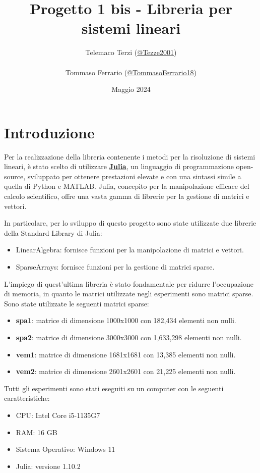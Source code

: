 \documentclass{article}
\title{Progetto 1 bis - Libreria per sistemi lineari}
\author{
    Telemaco Terzi (\href{https://github.com/Tezze2001}{@Tezze2001}) \\\\
    Tommaso Ferrario (\href{https://github.com/TommasoFerrario18}{@TommasoFerrario18})
    }
\date{Maggio 2024}
\begin{document}
\maketitle
\newtheorem{teorema}{Teorema}
\newtheorem{definizione}{Definizione}
\newtheorem{esempio}{Esempio}

\tableofcontents
\section{Introduzione}
Per la realizzazione della libreria contenente i metodi per la risoluzione di
sistemi lineari, è stato scelto di utilizzare \href{https://julialang.org/}{\textbf{Julia}},
un linguaggio di programmazione open-source, sviluppato per ottenere prestazioni
elevate e con una sintassi simile a quella di Python e MATLAB. Julia, concepito
per la manipolazione efficace del calcolo scientifico, offre una vasta gamma di
librerie per la gestione di matrici e vettori.

In particolare, per lo sviluppo di questo progetto sono state utilizzate due
librerie della Standard Library di Julia:
\begin{itemize}
    \item LinearAlgebra: fornisce funzioni per la manipolazione di matrici e vettori.
    \item SparseArrays: fornisce funzioni per la gestione di matrici sparse.
\end{itemize}

L'impiego di quest'ultima libreria è stato fondamentale per ridurre l'occupazione
di memoria, in quanto le matrici utilizzate negli esperimenti sono matrici sparse.
Sono state utilizzate le seguenti matrici sparse:
\begin{itemize}
    \item \textbf{spa1}: matrice di dimensione 1000x1000 con 182,434 elementi non nulli.
    \item \textbf{spa2}: matrice di dimensione 3000x3000 con 1,633,298 elementi non nulli.
    \item \textbf{vem1}: matrice di dimensione 1681x1681 con 13,385 elementi non nulli.
    \item \textbf{vem2}: matrice di dimensione 2601x2601 con 21,225 elementi non nulli.
\end{itemize}

Tutti gli esperimenti sono stati eseguiti su un computer con le seguenti caratteristiche:
\begin{itemize}
    \item CPU: Intel Core i5-1135G7
    \item RAM: 16 GB
    \item Sistema Operativo: Windows 11
    \item Julia: versione 1.10.2
\end{itemize}
\end{document}

